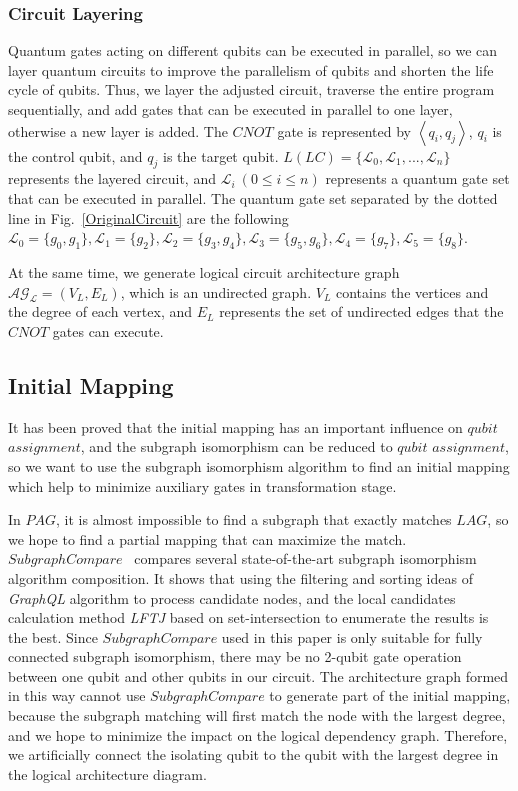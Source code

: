 \documentclass[runningheads]{llncs}
\begin{document}
\subsubsection{Circuit Layering}
Quantum gates acting on different qubits can be executed in parallel, 
so we can layer quantum circuits to improve the parallelism of qubits 
and shorten the life cycle of qubits.
Thus, we layer the adjusted circuit, 
traverse the entire program sequentially, 
and add gates that can be executed in parallel to one layer, 
otherwise a new layer is added. 
The $CNOT$ gate is represented by $\left \langle  q_{i}, q_{j} \right \rangle $, $q_{i}$ is the control qubit, 
and $q_{j}$ is the target qubit.
$L(LC)=\{\mathcal{L}_{0},\mathcal{L}_{1},...,\mathcal{L}_{n}\}$ represents the layered circuit, and
$\mathcal{L}_{i} \ (0 \le i \le n) $ represents a quantum gate set that can be executed in parallel.
The quantum gate set separated by the dotted line in Fig.~\ref{OriginalCircuit} are the following
 $\mathcal{L}_{0}=\{g_{0},g_{1}\},\mathcal{L}_{1}=\{g_{2}\},
 \mathcal{L}_{2}=\{g_{3},g_{4}\},\mathcal{L}_{3}=\{g_{5},g_{6}\},\mathcal{L}_{4}=\{g_{7}\},\mathcal{L}_{5}=\{g_{8}\}$.

At the same time, we generate logical
circuit architecture graph $\mathcal{AG_{L}}=(V_{L},E_{L})$,
 which is an undirected graph. $V_{L}$ contains the vertices and the degree of each vertex, 
and $E_{L}$ represents the set of undirected edges that the $CNOT$ gates can execute.

\subsection{Initial Mapping}
It has been proved that the initial mapping has an important influence on $qubit$  
$ assignment$, 
and the subgraph isomorphism can be reduced to $qubit$ $ assignment$, 
so we want to use the subgraph 
isomorphism algorithm to find an initial mapping which help to 
minimize auxiliary gates in transformation stage.

In $PAG$, it is almost impossible to find a subgraph that exactly 
matches $LAG$, so we hope to find a partial mapping that can maximize the match. 
$SubgraphCompare$~\cite{Sun2020} 
compares several state-of-the-art subgraph isomorphism algorithm composition. 
It shows that using the filtering and sorting ideas of \emph{GraphQL} algorithm to process 
candidate nodes, and the local candidates calculation method \emph{LFTJ} based on 
set-intersection to enumerate the results is the best.
Since $SubgraphCompare$ used in this paper is only suitable for 
fully connected subgraph isomorphism, 
there may be no 2-qubit gate operation between one qubit and other qubits in our circuit.
 The architecture graph formed in this way cannot use $SubgraphCompare$ 
to generate part of the initial mapping, 
 because the subgraph matching will first match the node with the largest degree, 
 and we hope to minimize the impact on the logical dependency graph. 
 Therefore, we artificially connect the isolating qubit to the qubit with 
 the largest degree in the logical architecture diagram.
\end{document}
